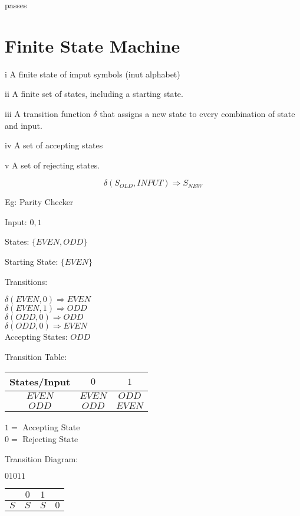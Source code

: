\documentclass[a4paper,12pt]{article}
\begin{document}
passes

\section{Finite State Machine}

i A finite state of imput symbols (inut alphabet)

ii A finite set of states, including a starting state.

iii A transition function  $\delta$ that assigns a new state to every
combination of state and input.

iv A set of accepting states

v A set of rejecting states.

\[ \delta(S_{OLD}, INPUT) \Rightarrow S_{NEW} \]


Eg: Parity Checker

Input: $0, 1$

States: $\{EVEN, ODD \}$

Starting State: $\{EVEN\}$

Transitions:	

$\delta(EVEN, 0) \Rightarrow EVEN $ \\
$\delta(EVEN, 1) \Rightarrow ODD $ \\
$\delta(ODD, 0) \Rightarrow ODD $ \\
$\delta(ODD, 0) \Rightarrow EVEN $ \\


Accepting States: ${ODD}$


Transition Table:

\begin{tabular}{|c|c|c|}
\hline
States/Input & $0$ 		& 	$1$ 	\\
\hline
$EVEN$		 & $EVEN$	& $ODD$	\\
\hline
$ODD$			 & $ODD$		& $EVEN$	\\
\hline
\end{tabular}

$1 = $ Accepting State \\

$0 = $ Rejecting State

Transition Diagram:


$01011$


\begin{tabular}{|c|c|c|c|}
\hline
		 	& $0$ 	& $1$ 	& 		\\
\hline
$S$		& $S$		& $S$		& $0$	\\
\hline
\end{tabular}
\end{document}
